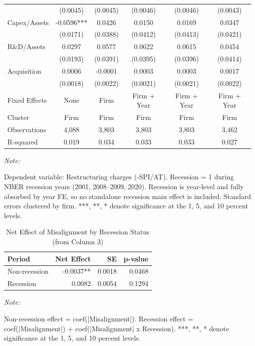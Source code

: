 \documentclass[
  10pt,
]{article}
\begin{document}
\begin{table}[!h]
{\begin{threeparttable}
\begin{tabular}[t]{lccccc}
 & (0.0045) & (0.0045) & (0.0046) & (0.0046) & (0.0043)\\
Capex/Assets & -0.0596*** & 0.0426 & 0.0150 & 0.0169 & 0.0347\\
\addlinespace
 & (0.0171) & (0.0388) & (0.0412) & (0.0413) & (0.0421)\\
R\&D/Assets & 0.0297 & 0.0577 & 0.0622 & 0.0615 & 0.0454\\
 & (0.0193) & (0.0391) & (0.0395) & (0.0396) & (0.0414)\\
Acquisition & 0.0006 & -0.0001 & 0.0003 & 0.0003 & 0.0017\\
 & (0.0018) & (0.0022) & (0.0021) & (0.0021) & (0.0022)\\
\midrule
\addlinespace
Fixed Effects & None & Firm & Firm + Year & Firm + Year & Firm + Year\\
Cluster & Firm & Firm & Firm & Firm & Firm\\
Observations & 4,088 & 3,803 & 3,803 & 3,803 & 3,462\\
R-squared & 0.019 & 0.034 & 0.033 & 0.033 & 0.027\\
\bottomrule
\end{tabular}
\begin{tablenotes}[para]
\item \textit{Note: } 
\item Dependent variable: Restructuring charges (-SPI/AT). Recession = 1 during NBER recession years (2001, 2008--2009, 2020). Recession is year-level and fully absorbed by year FE, so no standalone recession main effect is included. Standard errors clustered by firm. ***, **, * denote significance at the 1, 5, and 10 percent levels.
\end{tablenotes}
\end{threeparttable}}
\end{table}

\begin{table}[!h]
\centering
\caption{\label{tab:table4-net}Net Effect of Misalignment by Recession Status (from Column 3)}
\centering
\fontsize{9}{11}\selectfont
\begin{threeparttable}
\begin{tabular}[t]{lrrr}
\toprule
Period & Net Effect & SE & p-value\\
\midrule
Non-recession & -0.0037** & 0.0018 & 0.0468\\
Recession & 0.0082 & 0.0054 & 0.1294\\
\bottomrule
\end{tabular}
\begin{tablenotes}[para]
\item \textit{Note: } 
\item Non-recession effect = coef(|Misalignment|). Recession effect = coef(|Misalignment|) + coef(|Misalignment| x Recession). ***, **, * denote significance at the 1, 5, and 10 percent levels.
\end{tablenotes}
\end{threeparttable}
\end{table}
\end{document}
